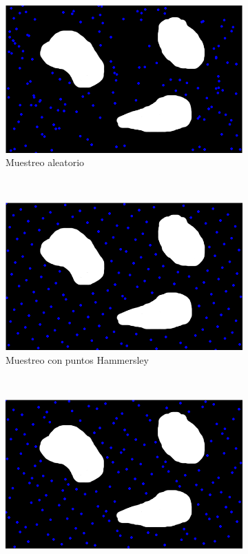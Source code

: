 \begin{figure}[b]
		\centering
        \begin{subfigure}[b]{0.3\textwidth}
                \centering
                \includegraphics[width=\textwidth]{images/random.png}
                \caption{Muestreo aleatorio}
                \label{fig:muestreo_aleatorio}
        \end{subfigure}
        ~
        \begin{subfigure}[b]{0.3\textwidth}
                \centering
                \includegraphics[width=\textwidth]{images/hammersley.png}
                \caption{Muestreo con puntos Hammersley}
                \label{fig:muestreo_hammersley}
        \end{subfigure}
        ~
        \begin{subfigure}[b]{0.3\textwidth}
         	   \centering
                \includegraphics[width=\textwidth]{images/halton.png}

\end{subfigure}
\end{figure}
